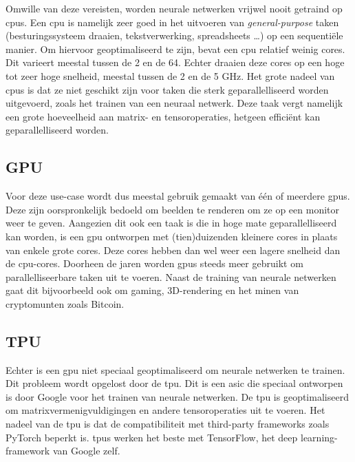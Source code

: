Omwille van deze vereisten, worden neurale netwerken vrijwel nooit getraind op \glspl{cpu}. Een \gls{cpu} is namelijk zeer goed in het uitvoeren van \emph{general-purpose} taken (besturingssysteem draaien, tekstverwerking, spreadsheets \dots) op een sequentiële manier. Om hiervoor geoptimaliseerd te zijn, bevat een \gls{cpu} relatief weinig cores. Dit varieert meestal tussen de 2 en de 64. Echter draaien deze cores op een hoge tot zeer hoge snelheid, meestal tussen de 2 en de 5 GHz. Het grote nadeel van \glspl{cpu} is dat ze niet geschikt zijn voor taken die sterk geparallelliseerd worden uitgevoerd, zoals het trainen van een neuraal netwerk. Deze taak vergt namelijk een grote hoeveelheid aan matrix- en tensoroperaties, hetgeen efficiënt kan geparallelliseerd worden. \\

\subsection{GPU}

Voor deze use-case wordt dus meestal gebruik gemaakt van één of meerdere \glspl{gpu}. Deze zijn oorspronkelijk bedoeld om beelden te renderen om ze op een monitor weer te geven. Aangezien dit ook een taak is die in hoge mate geparallelliseerd kan worden, is een \gls{gpu} ontworpen met (tien)duizenden kleinere cores in plaats van enkele grote cores. Deze cores hebben dan wel weer een lagere snelheid dan de \gls{cpu}-cores. Doorheen de jaren worden \glspl{gpu} steeds meer gebruikt om parallelliseerbare taken uit te voeren. Naast de training van neurale netwerken gaat dit bijvoorbeeld ook om gaming, 3D-rendering en het minen van cryptomunten zoals Bitcoin. \autocite{Anish_Dev_2014} \\

\subsection{TPU}
\label{subsec:tpu}

Echter is een \gls{gpu} niet speciaal geoptimaliseerd om neurale netwerken te trainen. Dit probleem wordt opgelost door de \gls{tpu}. Dit is een \gls{asic} die speciaal ontworpen is door Google voor het trainen van neurale netwerken. De \gls{tpu} is geoptimaliseerd om matrixvermenigvuldigingen en andere tensoroperaties uit te voeren. \autocite{Jouppi_2017} Het nadeel van de \gls{tpu} is dat de compatibiliteit met third-party frameworks zoals PyTorch beperkt is. \glspl{tpu} werken het beste met TensorFlow, het deep learning-framework van Google zelf. \autocite{Wang_2019} \\

